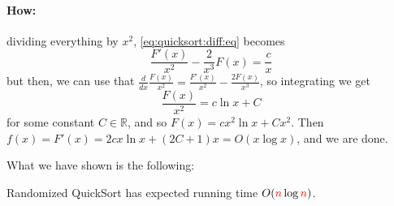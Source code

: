 \paragraph{\advancedstuff How:} dividing everything by $x^2$, \cref{eq:quicksort:diff:eq} becomes $$ \frac{F'(x)}{x^2} - \frac{2}{x^3} F(x) = \frac{c}{x} $$ but then, we can use that $\frac{d}{dx} \frac{F(x)}{x^2} = \frac{F'(x)}{x^2} - \frac{2F(x)}{x^3}$, so integrating we get $$ \frac{F(x)}{x^2} = c\ln x + C $$ for some constant $C\in\mathbb{R}$, and so $F(x) = c x^2 \ln x + C x^2$. Then $f(x)=F'(x) = 2c x \ln x + (2C+1) x = O(x \log x)$, and we are done.

What we have shown is the following:
\begin{theorem}
    Randomized QuickSort has expected running time $\bigO{\ns\log\ns}$.
\end{theorem}


